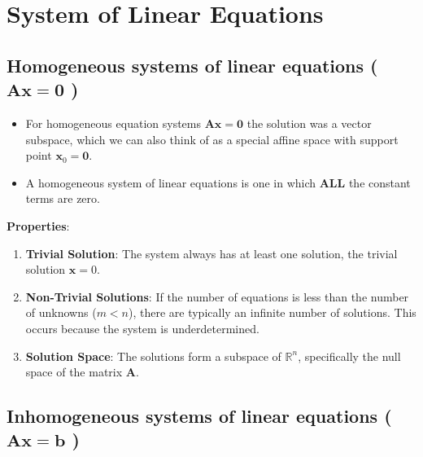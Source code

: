 

\section{System of Linear Equations \cite{mfml-1}}\label{System of Linear Equations}


\subsection{Homogeneous systems of linear equations ( $\mathbf{Ax = 0}$ ) \cite{mfml-1, chatgpt}}\label{Homogeneous systems of linear equations}

\begin{itemize}
    \item For homogeneous equation systems $\mathbf{Ax = 0}$ the solution was a vector subspace, which we can also think of as a special affine space with support point $\mathbf{x}_0 = \mathbf{0}$.

    \item A homogeneous system of linear equations is one in which \textbf{ALL} the constant terms are zero.
\end{itemize}

\vspace{0.2cm}
\textbf{Properties}:
\begin{enumerate}
    \item \textbf{Trivial Solution}: The system always has at least one solution, the trivial solution $\mathbf{x}=0$.

    \item \textbf{Non-Trivial Solutions}: If the number of equations is less than the number of unknowns ($m<n$), there are typically an infinite number of solutions. This occurs because the system is underdetermined.

    \item \textbf{Solution Space}: The solutions form a subspace of $\mathbb{R}^n$, specifically the null space of the matrix $\mathbf{A}$.
\end{enumerate}



\subsection{Inhomogeneous systems of linear equations ( $\mathbf{Ax = b}$ ) \cite{mfml-1, chatgpt}}\label{Inhomogeneous systems of linear equations}


